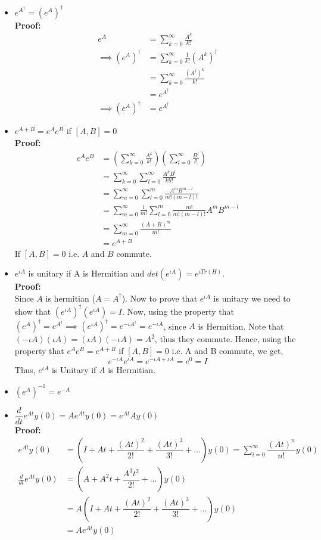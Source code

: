 \begin{itemize}
    \item $e^{A^{\dagger}}=(e^A)^{\dagger}$\\
    \textbf{Proof: }
    \begin{align*}
        e^A&=\sum_{k=0}^{\infty} \frac{A^k}{k!}\\
        \implies (e^A)^{\dagger}&=\sum_{k=0}^{\infty} \frac{1}{k!}(A^k)^{\dagger}\\
        &=\sum_{k=0}^{\infty} \frac{(A^{\dagger})^k}{k!}\\
        &=e^{A^{\dagger}}\\
        \implies (e^A)^{\dagger}&=e^{A^{\dagger}}
    \end{align*}
    \item $e^{A+B}=e^Ae^B$ if $[A,B]=0$\\
    \textbf{Proof: }
    \begin{align*}
    e^Ae^B&=\left(\sum_{k=0}^{\infty} \frac{A^k}{k!} \right)\left(\sum_{l=0}^{\infty} \frac{B^l}{l!}\right)\\
    &=\sum_{k=0}^{\infty} \sum_{l=0}^{\infty} \frac{A^{k}B^{l}}{k!l!}\\
    &=\sum_{m=0}^{\infty} \sum_{l=0}^{m} \frac{A^mB^{m-l}}{m!(m-l)!}\\
    &=\sum_{m=0}^{\infty} \frac{1}{m!} \sum_{l=0}^m \frac{m!}{m!(m-l)!}A^mB^{m-l}\\
    &=\sum_{m=0}^{\infty} \frac{(A+B)^m}{m!}\\
    &=e^{A+B}
    \end{align*}
    If $[A,B]=0$ i.e. $A$ and $B$ commute.
    \item $e^{\iota A}$ is unitary if A is Hermitian and $det(e^{\iota A})= e^{\iota Tr(H)}$.\\
    \textbf{Proof: }\\
    Since $A$ is hermitian ($A=A^{\dagger}$). Now to prove that $e^{\iota A}$ is unitary we need to show that $(e^{\iota A})^{\dagger}(e^{\iota A})=I$. Now, using the property that $(e^{A})^{\dagger}=e^{A^{\dagger}} \implies (e^{\iota A})^{\dagger}=e^{-\iota A^{\dagger}}=e^{-\iota A}$, since $A$ is Hermitian. Note that $(-\iota A)(\iota A)=(\iota A)(-\iota A)=A^2$, thus they commute. Hence, using the property that $e^A e^B=e^{A+B}$ if $[A,B]=0$ i.e. A and B commute, we get,
    \[
    e^{-\iota A}e^{\iota A}= e^{-\iota A +\iota A}=e^{0}=I
    \]
    Thus, $e^{\iota A}$ is Unitary if $A$ is Hermitian.
    \item $(e^{A})^{-1}=e^{-A}$
    \item $\dfrac{d}{dt}e^{At}y(0)=Ae^{At}y(0)=e^{At}Ay(0)$\\
    \textbf{Proof: }\\
    \begin{align*}
    e^{At}y(0)&=\left(I+At+\dfrac{(At)^2}{2!}+\dfrac{(At)^3}{3!}+\ldots \right)y(0)= \sum_{i=0}^{\infty} \dfrac{(At)^n}{n!}y(0)\\
    \frac{d}{dt}e^{At}y(0)&=\left(A+A^2t+\dfrac{A^3t^2}{2!}+\ldots\right)y(0)\\
    &=A(I+At+\dfrac{(At)^2}{2!}+\dfrac{(At)^3}{3!}+\ldots)y(0)\\
    &=Ae^{At}y(0)
    \end{align*}
    

\end{itemize}

